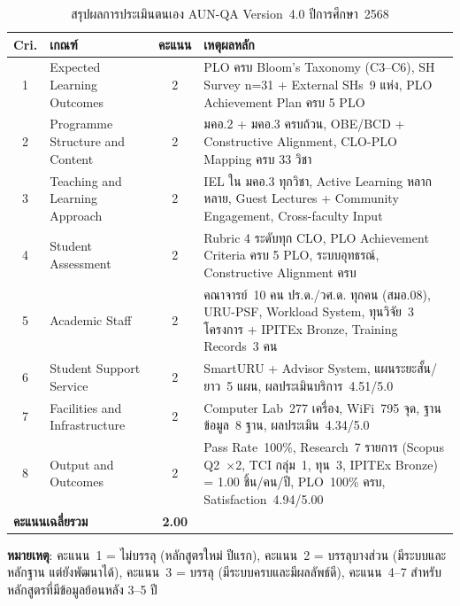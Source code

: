 \begin{table}[H]
  \centering
  \caption{สรุปผลการประเมินตนเอง AUN-QA Version~4.0 ปีการศึกษา~2568}
  \label{tbl:sar_summary}
  \begingroup
  \scriptsize
  \setlength{\tabcolsep}{3pt}
  \renewcommand{\arraystretch}{1.15}
  \begin{tabularx}{\linewidth}{|c|>{\raggedright\arraybackslash}X|c|>{\raggedright\arraybackslash}X|}
    \hline
    \textbf{Cri.} & \textbf{เกณฑ์} & \textbf{คะแนน} & \textbf{เหตุผลหลัก} \\
    \hline
    1 & Expected Learning Outcomes & 2 & PLO ครบ Bloom's Taxonomy (C3--C6), SH Survey n=31 + External SHs~9 แห่ง, PLO Achievement Plan ครบ 5 PLO \\
    \hline
    2 & Programme Structure and Content & 2 & มคอ.2 + มคอ.3 ครบถ้วน, OBE/BCD + Constructive Alignment, CLO-PLO Mapping ครบ 33 วิชา \\
    \hline
    3 & Teaching and Learning Approach & 2 & IEL ใน มคอ.3 ทุกวิชา, Active Learning หลากหลาย, Guest Lectures + Community Engagement, Cross-faculty Input \\
    \hline
    4 & Student Assessment & 2 & Rubric 4 ระดับทุก CLO, PLO Achievement Criteria ครบ 5 PLO, ระบบอุทธรณ์, Constructive Alignment ครบ \\
    \hline
    5 & Academic Staff & 2 & คณาจารย์~10 คน ปร.ด./วศ.ด. ทุกคน (สมอ.08), URU-PSF, Workload System, ทุนวิจัย~3 โครงการ + IPITEx Bronze, Training Records~3 คน \\
    \hline
    6 & Student Support Service & 2 & SmartURU + Advisor System, แผนระยะสั้น/ยาว~5 แผน, ผลประเมินบริการ~4.51/5.0 \\
    \hline
    7 & Facilities and Infrastructure & 2 & Computer Lab~277 เครื่อง, WiFi~795 จุด, ฐานข้อมูล~8 ฐาน, ผลประเมิน~4.34/5.0 \\
    \hline
    8 & Output and Outcomes & 2 & Pass Rate~100\%, Research~7 รายการ (Scopus Q2~×2, TCI กลุ่ม~1, ทุน~3, IPITEx Bronze) = 1.00 ชิ้น/คน/ปี, PLO~100\% ครบ, Satisfaction~4.94/5.00 \\
    \hline
    \multicolumn{2}{|l|}{\textbf{คะแนนเฉลี่ยรวม}} & \textbf{2.00} & \\
    \hline
  \end{tabularx}
  \endgroup
\end{table}

\vspace{0.5em}
\textbf{หมายเหตุ}: คะแนน~1 = ไม่บรรลุ (หลักสูตรใหม่ ปีแรก), คะแนน~2 = บรรลุบางส่วน (มีระบบและหลักฐาน แต่ยังพัฒนาได้), คะแนน~3 = บรรลุ (มีระบบครบและมีผลลัพธ์ดี), คะแนน~4--7 สำหรับหลักสูตรที่มีข้อมูลย้อนหลัง 3--5 ปี

